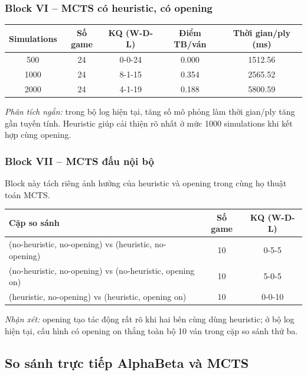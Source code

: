 \subsubsection{Block VI -- MCTS có heuristic, có opening}

\begin{center}
\begin{tabular}{|c|c|c|c|c|}
\hline
\textbf{Simulations} & \textbf{Số game} & \textbf{KQ (W-D-L)} & \textbf{Điểm TB/ván} & \textbf{Thời gian/ply (ms)} \\
\hline
500 & 24 & 0-0-24 & 0.000 & 1512.56 \\
\hline
1000 & 24 & 8-1-15 & 0.354 & 2565.52 \\
\hline
2000 & 24 & 4-1-19 & 0.188 & 5800.59 \\
\hline
\end{tabular}
\end{center}

\textit{Phân tích ngắn:} trong bộ log hiện tại, tăng số mô phỏng làm thời gian/ply tăng gần tuyến tính. Heuristic giúp cải thiện rõ nhất ở mức 1000 simulations khi kết hợp cùng opening.

\subsubsection{Block VII -- MCTS đấu nội bộ}

Block này tách riêng ảnh hưởng của heuristic và opening trong cùng họ thuật toán MCTS.

\begin{center}
\begin{tabular}{|p{8.0cm}|c|c|}
\hline
\textbf{Cặp so sánh} & \textbf{Số game} & \textbf{KQ (W-D-L)} \\
\hline
(no-heuristic, no-opening) vs (heuristic, no-opening) & 10 & 0-5-5 \\
\hline
(no-heuristic, no-opening) vs (no-heuristic, opening on) & 10 & 5-0-5 \\
\hline
(heuristic, no-opening) vs (heuristic, opening on) & 10 & 0-0-10 \\
\hline
\end{tabular}
\end{center}

\textit{Nhận xét:} opening tạo tác động rất rõ khi hai bên cùng dùng heuristic; ở bộ log hiện tại, cấu hình có opening on thắng toàn bộ 10 ván trong cặp so sánh thứ ba.

\subsection{So sánh trực tiếp AlphaBeta và MCTS}

